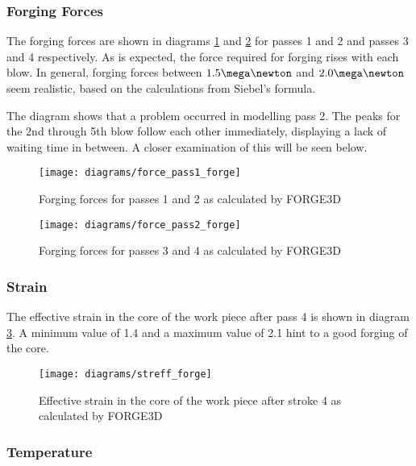 \subsubsection{Forging Forces}

The forging forces are shown in diagrams \ref{img:forgforce_forge_p1} and \ref{img:forgforce_forge_p2} for passes 1 and 2 and passes 3 and 4 respectively. As is expected, the force required for forging rises with each blow. In general, forging forces between $1.5\mega\newton$ and $2.0\mega\newton$ seem realistic, based on the calculations from Siebel's formula.

The diagram shows that a problem occurred in modelling pass 2. The peaks for the 2nd through 5th blow follow each other immediately, displaying a lack of waiting time in between. A closer examination of this will be seen below.

\begin{figure}[tb]
  \centering
  \texttt{[image: diagrams/force\_pass1\_forge]}
  \caption{Forging forces for passes 1 and 2 as calculated by FORGE3D}
  \label{img:forgforce_forge_p1}
\end{figure}

\begin{figure}[tb]
  \centering
  \texttt{[image: diagrams/force\_pass2\_forge]}
  \caption{Forging forces for passes 3 and 4 as calculated by FORGE3D}
  \label{img:forgforce_forge_p2}
\end{figure}

\subsubsection{Strain}

The effective strain in the core of the work piece after pass 4 is shown in diagram \ref{img:streff_forge}. A minimum value of 1.4 and a maximum value of 2.1 hint to a good forging of the core.

\begin{figure}[tb]
  \centering
  \texttt{[image: diagrams/streff\_forge]}
  \caption{Effective strain in the core of the work piece after stroke 4 as calculated by FORGE3D}
  \label{img:streff_forge}
\end{figure}

\subsubsection{Temperature}


